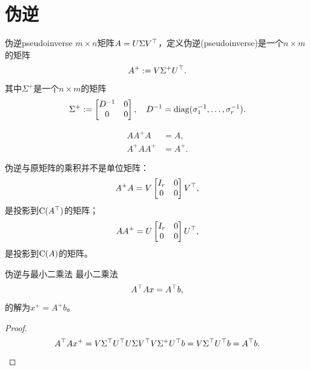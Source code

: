 \section{伪逆}

\begin{definition}{伪逆}{pseudoinverse}
	$m\times n$矩阵$A=U\Sigma V^\top$，定义伪逆(pseudoinverse)是一个$n\times m$的矩阵
	\begin{equation}
		A^+:=V\Sigma^+U^\top.
	\end{equation}
	其中$\Sigma^+$是一个$n\times m$的矩阵
	\[
		\Sigma^+:=\begin{bmatrix}
			D^{-1}&0\\0&0
		\end{bmatrix},\quad D^{-1}=\operatorname{diag}(\sigma_1^{-1},\ldots,\sigma_r^{-1}).
	\]
\end{definition}

\begin{corollary}
	\begin{subequations}
		\begin{align}
			AA^+A&=A,\\
			A^+AA^+&=A^+.
		\end{align}
	\end{subequations}
\end{corollary}

\begin{remark}
	伪逆与原矩阵的乘积并不是单位矩阵：
	\[
		A^+A=V\begin{bmatrix}
			I_r&0\\0&0
		\end{bmatrix}V^\top,
	\]
	是投影到$\operatorname{C}(A^\top)$的矩阵；
	\[
		AA^+=U\begin{bmatrix}
			I_r&0\\0&0
		\end{bmatrix}U^\top,
	\]
	是投影到$\operatorname{C}(A)$的矩阵。
\end{remark}
\begin{theorem}{伪逆与最小二乘法}{}
	最小二乘法
	\[
		A^\top Ax=A^\top b,
	\]
	的解为$x^+=A^+b$。
\end{theorem}
\begin{proof}
	\[
		A^\top Ax^+=V\Sigma^\top U^\top U\Sigma V^\top V\Sigma^+U^\top b=V\Sigma^\top U^\top b=A^\top b.
		\qedhere
	\]
\end{proof}

